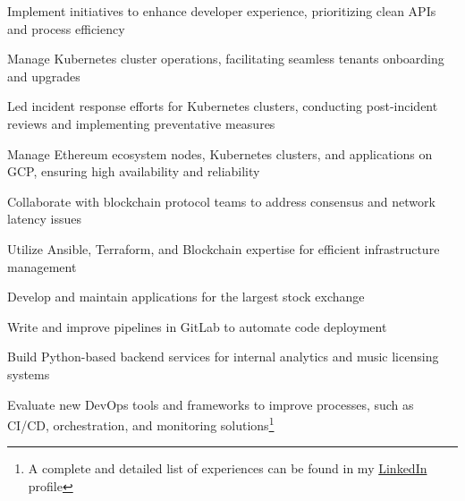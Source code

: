 \documentclass[]{willianpaixao-resume}
\begin{document}
\begin{minipage}[t]{0.64\textwidth}
\begin{tightemize}
\item Implement initiatives to enhance developer experience, prioritizing clean APIs and process efficiency
\item Manage Kubernetes cluster operations, facilitating seamless tenants onboarding and upgrades
\item Led incident response efforts for Kubernetes clusters, conducting post-incident reviews and implementing preventative measures
\end{tightemize}
\sectionsep

\begin{tightemize}
\item Manage Ethereum ecosystem nodes, Kubernetes clusters, and applications on GCP, ensuring high availability and reliability
\item Collaborate with blockchain protocol teams to address consensus and network latency issues
\item Utilize Ansible, Terraform, and Blockchain expertise for efficient infrastructure management
\end{tightemize}
\sectionsep

\begin{tightemize}
\item Develop and maintain applications for the largest stock exchange
\item Write and improve pipelines in GitLab to automate code deployment
\end{tightemize}
\sectionsep

\begin{tightemize}
\item Build Python-based backend services for internal analytics and music licensing systems
\item Evaluate new DevOps tools and frameworks to improve processes, such as CI/CD, orchestration, and monitoring solutions\footnote{A complete and detailed list of experiences can be found in my \href{https://www.linkedin.com/in/willianpaixao/details/experience/}{LinkedIn} profile}
\end{tightemize}
\sectionsep


\end{minipage}
\end{document}
